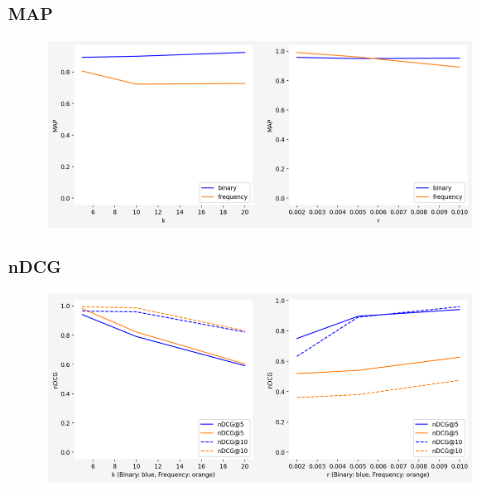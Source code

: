 \documentclass{beamer}
\begin{document}
\begin{frame}
\frametitle{MAP} 
\begin{block}{} \vspace{-1cm}
\begin{figure}[h] 
\includegraphics[width=1 \textwidth]{MAP}
\end{figure}
\end{block}
\end{frame}


\begin{frame}
\frametitle{nDCG} 
\begin{block}{} \vspace{-1cm}
\begin{figure}[h] 
\includegraphics[width=1 \textwidth]{nDCG} 
\end{figure}
\end{block}
\end{frame}
\end{document}
